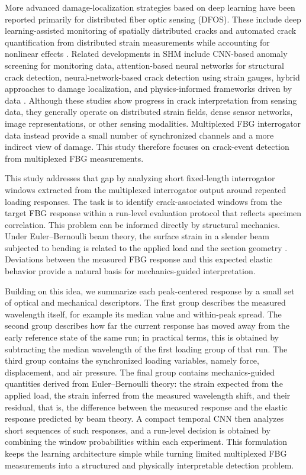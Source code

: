 \documentclass[notspecified,article,submit,pdftex,moreauthors]{Definitions/mdpi}
\begin{document}
More advanced damage-localization strategies based on deep learning have been reported primarily for distributed fiber optic sensing (DFOS). These include deep learning-assisted monitoring of spatially distributed cracks and automated crack quantification from distributed strain measurements while accounting for nonlinear effects \cite{liu2023,lu2025}. Related developments in SHM include CNN-based anomaly screening for monitoring data, attention-based neural networks for structural crack detection, neural-network-based crack detection using strain gauges, hybrid approaches to damage localization, and physics-informed frameworks driven by data \cite{kim2023,yuan2023,yoon2022,moreh2025,si2025}. Although these studies show progress in crack interpretation from sensing data, they generally operate on distributed strain fields, dense sensor networks, image representations, or other sensing modalities. Multiplexed FBG interrogator data instead provide a small number of synchronized channels and a more indirect view of damage. This study therefore focuses on crack-event detection from multiplexed FBG measurements.

This study addresses that gap by analyzing short fixed-length interrogator windows extracted from the multiplexed interrogator output around repeated loading responses. The task is to identify crack-associated windows from the target FBG response within a run-level evaluation protocol that reflects specimen correlation. This problem can be informed directly by structural mechanics. Under Euler--Bernoulli beam theory, the surface strain in a slender beam subjected to bending is related to the applied load and the section geometry \cite{ochsner2021}. Deviations between the measured FBG response and this expected elastic behavior provide a natural basis for mechanics-guided interpretation.

Building on this idea, we summarize each peak-centered response by a small set of optical and mechanical descriptors. The first group describes the measured wavelength itself, for example its median value and within-peak spread. The second group describes how far the current response has moved away from the early reference state of the same run; in practical terms, this is obtained by subtracting the median wavelength of the first loading group of that run. The third group contains the synchronized loading variables, namely force, displacement, and air pressure. The final group contains mechanics-guided quantities derived from Euler--Bernoulli theory: the strain expected from the applied load, the strain inferred from the measured wavelength shift, and their residual, that is, the difference between the measured response and the elastic response predicted by beam theory. A compact temporal CNN then analyzes short sequences of such responses, and a run-level decision is obtained by combining the window probabilities within each experiment. This formulation keeps the learning architecture simple while turning limited multiplexed FBG measurements into a structured and physically interpretable detection problem.
\end{document}
